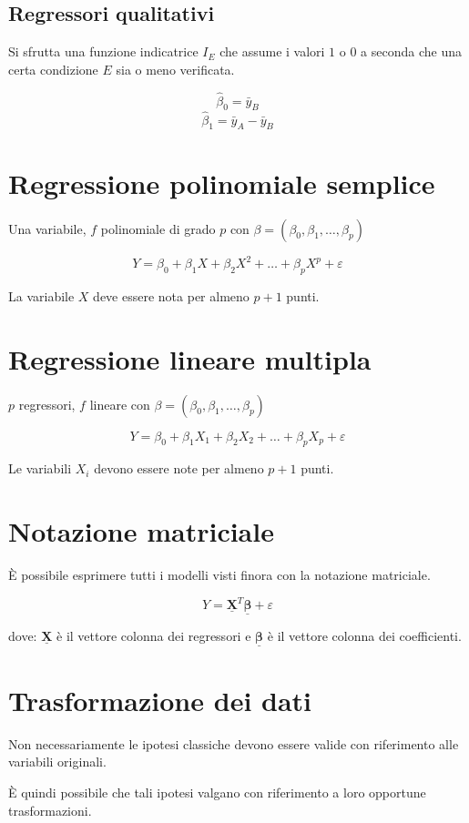 \documentclass[11pt,onecolumn,a4paper,oneside]{book}
\begin{document}
\subsection{Regressori qualitativi}
Si sfrutta una funzione indicatrice $I_E$ che assume i valori $1$ o $0$ a seconda che una certa condizione $E$ sia o meno verificata.

$$\hat \beta_0 = \bar y_B$$
$$\hat \beta_1 = \bar {y}_A - \bar{y}_B $$

\section{Regressione polinomiale semplice}
Una variabile, $f$ polinomiale di grado $p$ con $\beta=(\beta_0, \beta_1, \dots, \beta_p)$

$$Y = \beta_0 + \beta_1 X + \beta_2 X^2 + \dots + \beta_p X^p + \varepsilon $$

La variabile $X$ deve essere nota per almeno $p+1$ punti.

\section{Regressione lineare multipla}
$p$ regressori, $f$ lineare con $\beta=(\beta_0, \beta_1, \dots, \beta_p)$

$$Y = \beta_0 + \beta_1 X_1 + \beta_2 X_2 + \dots + \beta_p X_p + \varepsilon $$

Le variabili $X_i$ devono essere note per almeno $p+1$ punti.

\section{Notazione matriciale}
È possibile esprimere tutti i modelli visti finora con la notazione matriciale.

$$Y= \underline{\mathbf{X}}^T \underline{\mathbf{\beta}} + \varepsilon$$

dove:
$\underline{\mathbf{X}}$ è il vettore colonna dei regressori e $\underline{\mathbf{\beta}}$ è il vettore colonna dei coefficienti.

\section{Trasformazione dei dati}
Non necessariamente le ipotesi classiche devono essere valide con riferimento alle variabili originali.

È quindi possibile che tali ipotesi valgano con riferimento a loro opportune trasformazioni.
\end{document}
